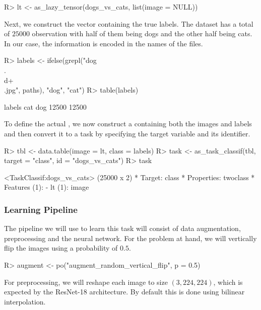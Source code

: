\documentclass[article]{jss}
\theoremstyle{definition}
\begin{document}
\begin{CodeInput}
R> lt <- as_lazy_tensor(dogs_vs_cats, list(image = NULL))
\end{CodeInput}

Next, we construct the vector containing the true labels.
The dataset has a total of $25000$ observation with half of them being dogs and the other half being cats.
In our case, the information is encoded in the names of the files.

\begin{CodeInput}
R> labels <- ifelse(grepl("dog\\.\\d+\\.jpg", paths), "dog", "cat")
R> table(labels)
\end{CodeInput}
\begin{CodeOutput}
labels
  cat   dog
12500 12500
\end{CodeOutput}

To define the actual , we now construct a  \citep{ref-datatable2024} containing both the images and labels and then convert it to a task by specifying the target variable and its identifier.

\begin{CodeInput}
R> tbl <- data.table(image = lt, class = labels)
R> task <- as_task_classif(tbl, target = "class", id = "dogs_vs_cats")
R> task
\end{CodeInput}
\begin{CodeOutput}
<TaskClassif:dogs_vs_cats> (25000 x 2)
* Target: class
* Properties: twoclass
* Features (1):
  - lt (1): image
\end{CodeOutput}

\subsubsection{Learning Pipeline}

The pipeline we will use to learn this task will consist of data augmentation, preprocessing and the neural network.
For the problem at hand, we will vertically flip the images using a probability of $0.5$.

\begin{CodeInput}
R> augment <- po("augment_random_vertical_flip", p = 0.5)
\end{CodeInput}

For preprocessing, we will reshape each image to size $(3, 224, 224)$, which is expected by the ResNet-18 architecture.
By default this is done using bilinear interpolation.
\end{document}
